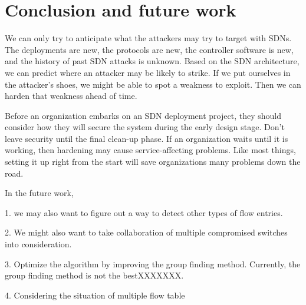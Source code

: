 \chapter{Conclusion and future work}
\label{conclusion}

We can only try to anticipate what the attackers may try to target with SDNs.  The deployments are new, the protocols are new, the controller software is new, and the history of past SDN attacks is unknown.  Based on the SDN architecture, we can predict where an attacker may be likely to strike.  If we put ourselves in the attacker’s shoes, we might be able to spot a weakness to exploit. Then we can harden that weakness ahead of time.

Before an organization embarks on an SDN deployment project, they should consider how they will secure the system during the early design stage.  Don’t leave security until the final clean-up phase.  If an organization waits until it is working, then hardening  may cause service-affecting problems.  Like most things, setting it up right from the start will save organizations many problems down the road.

In the future work, 

1. we may also want to figure out a way to detect other types of flow entries.

2. We might also want to take collaboration of multiple compromised switches into consideration.

3. Optimize the algorithm by improving the group finding method. Currently, the group finding method is not the bestXXXXXXX.

4. Considering the situation of multiple flow table